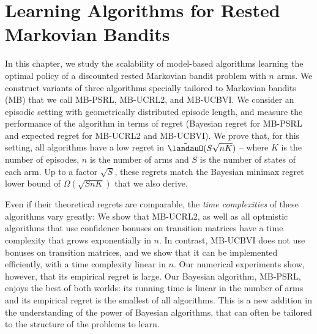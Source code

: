 \begingroup

\let\clearpage\relax

\chapter{Learning Algorithms for Rested Markovian Bandits}
\label{ch:learning_rested}

In this chapter, we study the scalability of model-based algorithms learning the optimal policy of a discounted rested Markovian bandit problem with $n$ arms. %
We construct variants of three algorithms specially tailored to Markovian bandits (MB) that we call MB-PSRL, MB-UCRL2, and MB-UCBVI. We consider an episodic setting with geometrically distributed episode length, and measure the performance of the algorithm in terms of regret (Bayesian regret for MB-PSRL and expected regret for MB-UCRL2 and MB-UCBVI). We prove that, for this setting, all algorithms have a low regret in $\tilde{\landauO}(S\sqrt{nK})$ -- where $K$ is the number of episodes, $n$ is the number of arms and $S$ is the number of states of each arm. Up to a factor $\sqrt{S}$, these regrets match the Bayesian minimax regret lower bound of $\Omega(\sqrt{SnK})$ that we also derive.

Even if their theoretical regrets are comparable, the \emph{time complexities} of these algorithms vary greatly: We show that MB-UCRL2, as well as all optmistic algorithms that use confidence bonuses on transition matrices have a {time} complexity that grows exponentially in $n$. In contrast, MB-UCBVI does not use bonuses on transition matrices, and we show that  it can be implemented efficiently, with a time complexity linear in $n$. Our numerical experiments show, however, that its empirical regret is large. Our Bayesian algorithm, MB-PSRL, enjoys the best of both worlds: its running time is linear in the number of arms and its empirical regret is the smallest of all algorithms.
This is a new addition in the understanding of the power of Bayesian algorithms, that can often be  tailored to the structure of the problems to learn.

